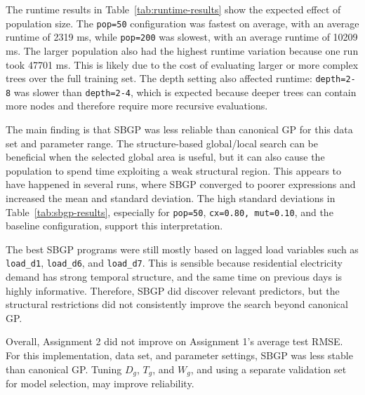 \documentclass{article}
\begin{document}
\begin{table}[h]
\centering
{}
\caption{SBGP runtime results across 15 runs per configuration.}
\label{tab:runtime-results}
\end{table}

The runtime results in Table~\ref{tab:runtime-results} show the expected effect of population size. The \texttt{pop=50} configuration was fastest on average, with an average runtime of 2319 ms, while \texttt{pop=200} was slowest, with an average runtime of 10209 ms. The larger population also had the highest runtime variation because one run took 47701 ms. This is likely due to the cost of evaluating larger or more complex trees over the full training set. The depth setting also affected runtime: \texttt{depth=2-8} was slower than \texttt{depth=2-4}, which is expected because deeper trees can contain more nodes and therefore require more recursive evaluations.

The main finding is that SBGP was less reliable than canonical GP for this data set and parameter range. The structure-based global/local search can be beneficial when the selected global area is useful, but it can also cause the population to spend time exploiting a weak structural region. This appears to have happened in several runs, where SBGP converged to poorer expressions and increased the mean and standard deviation. The high standard deviations in Table~\ref{tab:sbgp-results}, especially for \texttt{pop=50}, \texttt{cx=0.80, mut=0.10}, and the baseline configuration, support this interpretation.

The best SBGP programs were still mostly based on lagged load variables such as \texttt{load\_d1}, \texttt{load\_d6}, and \texttt{load\_d7}. This is sensible because residential electricity demand has strong temporal structure, and the same time on previous days is highly informative. Therefore, SBGP did discover relevant predictors, but the structural restrictions did not consistently improve the search beyond canonical GP.

Overall, Assignment 2 did not improve on Assignment 1's average test RMSE. For this implementation, data set, and parameter settings, SBGP was less stable than canonical GP. Tuning $D_g$, $T_g$, and $W_g$, and using a separate validation set for model selection, may improve reliability.
\end{document}
